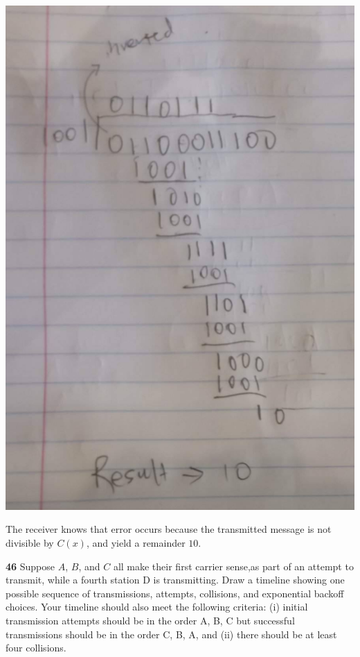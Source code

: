 \documentclass[11pt]{article}
\begin{document}
\begin{enumerate}
\begin{center}
        \includegraphics[scale=0.4]{2_18_2}        
    \end{center}
    The receiver knows that error occurs because the transmitted message is not divisible by $C(x)$, and yield a remainder $10$.
\end{enumerate}


\textbf{46} Suppose $A$, $B$, and $C$ all make their first carrier sense,as part of an attempt to transmit, while a fourth station D is transmitting. Draw a timeline showing one possible sequence of transmissions, attempts, collisions, and exponential backoff choices. Your timeline should also meet the following criteria: (i) initial transmission attempts should be in the order A, B, C but successful transmissions should be in the order C, B, A, and (ii) there should be at least four collisions.
\end{document}
